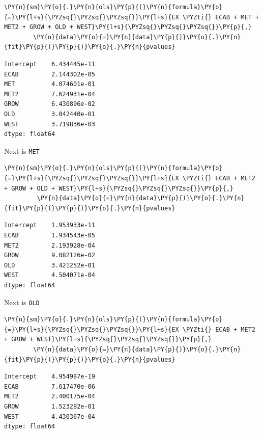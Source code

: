 \documentclass[10pt]{article}\usepackage[]{graphicx}\usepackage[]{xcolor}
\begin{document}
    \begin{Verbatim}[commandchars=\\\{\}]
\PY{n}{sm}\PY{o}{.}\PY{n}{ols}\PY{p}{(}\PY{n}{formula}\PY{o}{=}\PY{l+s}{\PYZsq{}\PYZsq{}\PYZsq{}}\PY{l+s}{EX \PYZti{} ECAB + MET + MET2 + GROW + OLD + WEST}\PY{l+s}{\PYZsq{}\PYZsq{}\PYZsq{}}\PY{p}{,}
        \PY{n}{data}\PY{o}{=}\PY{n}{data}\PY{p}{)}\PY{o}{.}\PY{n}{fit}\PY{p}{(}\PY{p}{)}\PY{o}{.}\PY{n}{pvalues}
\end{Verbatim}

            \begin{Verbatim}[commandchars=\\\{\}]
Intercept    6.434445e-11
ECAB         2.144302e-05
MET          4.074601e-01
MET2         7.624931e-04
GROW         6.430896e-02
OLD          3.042440e-01
WEST         3.719836e-03
dtype: float64
\end{Verbatim}
        
    Next is \texttt{MET}

    \begin{Verbatim}[commandchars=\\\{\}]
\PY{n}{sm}\PY{o}{.}\PY{n}{ols}\PY{p}{(}\PY{n}{formula}\PY{o}{=}\PY{l+s}{\PYZsq{}\PYZsq{}\PYZsq{}}\PY{l+s}{EX \PYZti{} ECAB + MET2 + GROW + OLD + WEST}\PY{l+s}{\PYZsq{}\PYZsq{}\PYZsq{}}\PY{p}{,}
         \PY{n}{data}\PY{o}{=}\PY{n}{data}\PY{p}{)}\PY{o}{.}\PY{n}{fit}\PY{p}{(}\PY{p}{)}\PY{o}{.}\PY{n}{pvalues}
\end{Verbatim}

            \begin{Verbatim}[commandchars=\\\{\}]
Intercept    1.953933e-11
ECAB         1.934543e-05
MET2         2.193928e-04
GROW         9.082126e-02
OLD          3.421252e-01
WEST         4.504071e-04
dtype: float64
\end{Verbatim}
        
    Next is \texttt{OLD}

    \begin{Verbatim}[commandchars=\\\{\}]
\PY{n}{sm}\PY{o}{.}\PY{n}{ols}\PY{p}{(}\PY{n}{formula}\PY{o}{=}\PY{l+s}{\PYZsq{}\PYZsq{}\PYZsq{}}\PY{l+s}{EX \PYZti{} ECAB + MET2 + GROW + WEST}\PY{l+s}{\PYZsq{}\PYZsq{}\PYZsq{}}\PY{p}{,}
        \PY{n}{data}\PY{o}{=}\PY{n}{data}\PY{p}{)}\PY{o}{.}\PY{n}{fit}\PY{p}{(}\PY{p}{)}\PY{o}{.}\PY{n}{pvalues}
\end{Verbatim}

            \begin{Verbatim}[commandchars=\\\{\}]
Intercept    4.954987e-19
ECAB         7.617470e-06
MET2         2.400175e-04
GROW         1.523282e-01
WEST         4.430367e-04
dtype: float64
\end{Verbatim}
        
\end{document}
